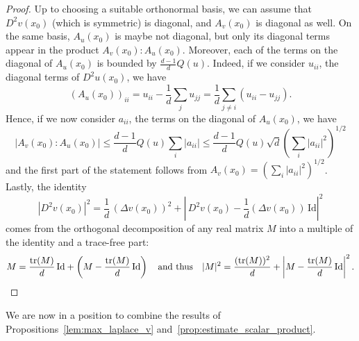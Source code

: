 \documentclass[11pt,a4paper]{article}
\numberwithin{equation}{section}
\theoremstyle{plain}
\theoremstyle{remark}
\newcommand {\f}{\frac}
\begin{document}
\begin{proof}%
Up to choosing a suitable orthonormal basis, we can assume that $D^2 v(x_0)$ (which is symmetric) is diagonal, and $A_v(x_0)$ is diagonal as well. On the same basis, $A_u(x_0)$ is maybe not diagonal, but only its diagonal terms appear in the product $A_v(x_0):A_u(x_0)$. Moreover, each of the terms on the diagonal of $A_u(x_0)$ is bounded by $\frac{d-1}{d}Q(u)$. Indeed, if we consider $u_{ii}$, the diagonal terms of $D^2u(x_0)$, we have
$$
    (A_u(x_0))_{ii}=u_{ii}-\frac1d\sum_j u_{jj}=\frac{1}{d}\sum_{j\neq i} (u_{ii}-u_{jj}).
$$  
Hence, if we now consider $a_{ii}$, the terms on the diagonal of $A_u(x_0)$, we have
$$
    |A_v(x_0):A_u(x_0)|\leq \frac{d-1}{d}Q(u)\sum_i|a_{ii}|\leq \frac{d-1}{d}Q(u)\sqrt{d}\left(\sum_i|a_{ii}|^2\right)^{1/2}
$$
and the first part of the statement follows from  $A_v(x_0)=\left(\sum_i|a_{ii}|^2\right)^{1/2}$.
Lastly, the identity
\[
\left|D^2 v(x_0)\right|^2 
   =  
\f1d\,\left(\Delta v(x_0)\right)^2 
  + 
\left|\,D^2 v(x_0)  -  \f1d(\Delta v(x_0))\,\mathrm{Id}\right|^2
\]
comes from the orthogonal decomposition of any real matrix $M$ into a multiple of the identity and a trace-free part:
\[
M 
 = 
\f{\mathrm{tr}(M)}{d}\,\mathrm{Id} 
 + 
\left(M - \f{\mathrm{tr}(M)}{d}\,\mathrm{Id}\right)
\quad
\text{and thus}
\quad
|M|^2 
 = 
\f{(\mathrm{tr}(M))^2}{d} 
 + 
\left|M - \f{\mathrm{tr}(M)}{d}\,\mathrm{Id}\right|^2.\qedhere
\]
\end{proof}

We are now in a position to combine the results of Propositions~\ref{lem:max_laplace_v} and~\ref{prop:estimate_scalar_product}.
\end{document}
